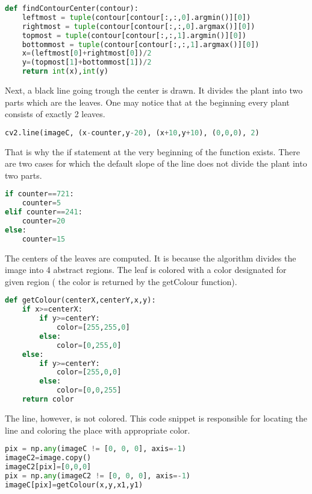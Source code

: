\documentclass[12pt]{article}
\begin{document}
\vspace{5mm}
\begin{lstlisting}[language=Python]
def findContourCenter(contour):
	leftmost = tuple(contour[contour[:,:,0].argmin()][0])
	rightmost = tuple(contour[contour[:,:,0].argmax()][0])
	topmost = tuple(contour[contour[:,:,1].argmin()][0])
	bottommost = tuple(contour[contour[:,:,1].argmax()][0])
	x=(leftmost[0]+rightmost[0])/2
	y=(topmost[1]+bottommost[1])/2
	return int(x),int(y)
\end{lstlisting}
\vspace{5mm}
Next, a black line going trough the center is drawn. It divides the plant into two parts which are the leaves. One may notice that at the beginning every plant consists of exactly 2 leaves. 
\vspace{5mm}
\begin{lstlisting}[language=Python]
cv2.line(imageC, (x-counter,y-20), (x+10,y+10), (0,0,0), 2)
\end{lstlisting}
\vspace{5mm}
That is why the if statement at the very beginning of the function exists. There are two cases for which the default slope of the line does not divide the plant into two parts.
\vspace{5mm}
\begin{lstlisting}[language=Python]
if counter==721:
	counter=5
elif counter==241:
	counter=20
else:
	counter=15
\end{lstlisting}
\vspace{5mm}
The centers of the leaves are computed. It is because the algorithm divides the image into 4 abstract regions. The leaf is colored with a color designated for given region ( the color is returned by the getColour function).
\vspace{5mm}
\begin{lstlisting}[language=Python]
def getColour(centerX,centerY,x,y):
	if x>=centerX:
		if y>=centerY:
			color=[255,255,0]
		else:
			color=[0,255,0]
	else:
		if y>=centerY:
			color=[255,0,0]
		else:
			color=[0,0,255]
	return color
\end{lstlisting}
\vspace{5mm}
 The line, however, is not colored. This code snippet is responsible for locating the line and coloring the place with appropriate color.
\vspace{5mm}
\begin{lstlisting}[language=Python]
pix = np.any(imageC != [0, 0, 0], axis=-1)
imageC2=image.copy()
imageC2[pix]=[0,0,0]
pix = np.any(imageC2 != [0, 0, 0], axis=-1)
imageC[pix]=getColour(x,y,x1,y1)
\end{lstlisting}\vspace{5mm}
\end{document}

